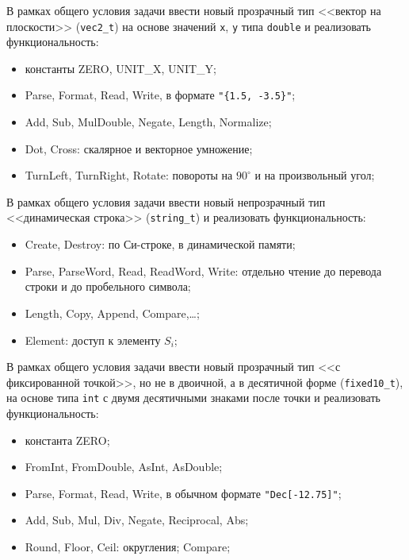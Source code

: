 \begin{zztask}[Векторы в 2D]
В рамках общего условия задачи ввести новый прозрачный тип <<вектор на плоскости>>
(\texttt{vec2\_t}) на основе значений \texttt{x}, \texttt{y}
типа \texttt{double} и реализовать функциональность:
%
\begin{itemize}
\item константы ZERO, UNIT\_X, UNIT\_Y;
\item Parse, Format, Read, Write, в формате \verb|"{1.5, -3.5}"|;
\item Add, Sub, MulDouble, Negate, Length, Normalize;
\item Dot, Cross: скалярное и векторное умножение;
\item TurnLeft, TurnRight, Rotate: повороты на $90^\circ$ и на произвольный угол;
\end{itemize}
\end{zztask}


\begin{zztask}[Строки]
В рамках общего условия задачи ввести новый непрозрачный тип <<динамическая строка>>
(\texttt{string\_t}) и реализовать функциональность:
%
\begin{itemize}
\item Create, Destroy: по Си-строке, в динамической памяти;
\item Parse, ParseWord, Read, ReadWord, Write: отдельно чтение до перевода строки и до пробельного символа;
\item Length, Copy, Append, Compare,\dots;
\item Element: доступ к элементу $S_{i}$;
\end{itemize}
\end{zztask}


\begin{zztask}
В рамках общего условия задачи ввести новый прозрачный тип <<с фиксированной точкой>>,
но не в двоичной, а в десятичной форме (\texttt{fixed10\_t}), на основе типа \texttt{int}
с двумя десятичными знаками после точки и реализовать функциональность:
%
\begin{itemize}
\item константа ZERO;
\item FromInt, FromDouble, AsInt, AsDouble;
\item Parse, Format, Read, Write, в обычном формате \verb|"Dec[-12.75]"|;
\item Add, Sub, Mul, Div, Negate, Reciprocal, Abs;
\item Round, Floor, Ceil: округления; Compare;
\end{itemize}
\end{zztask}

